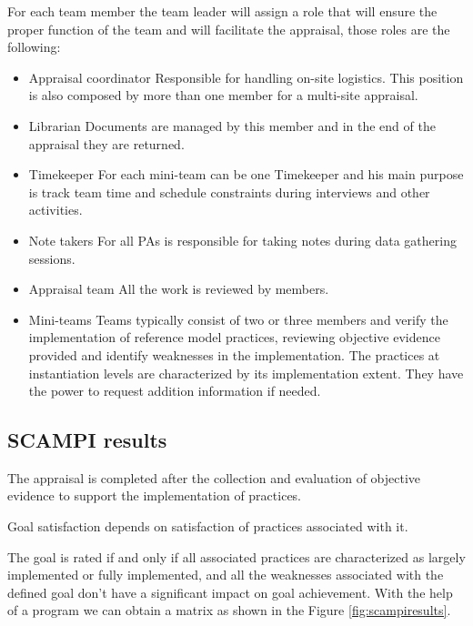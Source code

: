 For each team member the team leader will assign a role that will ensure the proper function of the team and will facilitate the appraisal, those roles are the following:
\begin{itemize}
	\item Appraisal coordinator
	\subitem Responsible for handling on-site logistics. This position is also composed by more than one member for a multi-site appraisal.
	\item Librarian
	\subitem Documents are managed by this member and in the end of the appraisal they are returned.
	\item Timekeeper
	\subitem For each mini-team can be one Timekeeper and his main purpose is track team time and schedule constraints during interviews and other activities.
	\item Note takers
	\subitem For all PAs is responsible for taking notes during data gathering sessions.
	\item Appraisal team
	\subitem All the work is reviewed by members.
	\item Mini-teams
	\subitem Teams typically consist of two or three members and verify the implementation of reference model practices, reviewing objective evidence provided and identify weaknesses in the implementation. The practices at instantiation levels are characterized by its implementation extent. They have the power to request addition information if needed. 
\end{itemize}

\subsection{SCAMPI results}

The appraisal is completed after the collection and evaluation of objective evidence to support the implementation of practices.

Goal satisfaction depends on satisfaction of practices associated with it.

The goal is rated if and only if all associated practices are characterized as largely implemented or fully implemented, and all the weaknesses associated with the defined goal don't have a significant impact on goal achievement.
With the help of a program we can obtain a matrix as shown in the Figure \ref{fig:scampiresults}.
 
% 
 
